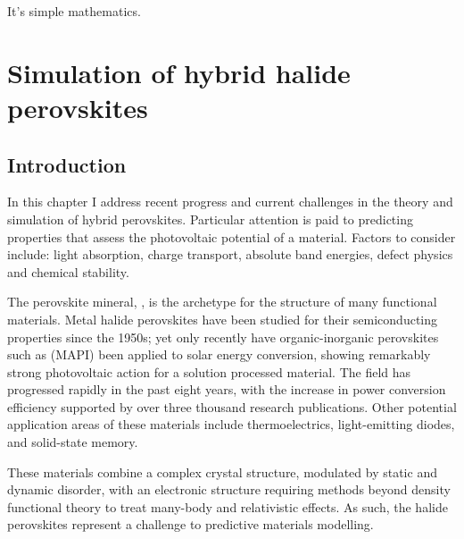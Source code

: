 \begin{savequote}[8cm]
It's simple mathematics.
\end{savequote}

\chapter{\label{ch:2-litreview}Simulation of hybrid halide perovskites}

\section{Introduction}

In this chapter I address recent progress and current challenges in the theory and simulation of hybrid perovskites. 
Particular attention is paid to predicting properties that assess the photovoltaic potential of a material. 
Factors to consider include: light absorption, charge transport, absolute band energies, defect physics and chemical stability. 

The perovskite mineral, , is the archetype for the structure of many functional materials.\autocite{Schaak2002}
Metal halide perovskites have been studied for their semiconducting properties since the 1950s\autocite{Moller1958}; 
yet only recently have organic-inorganic perovskites such as  (MAPI) been applied to solar energy conversion, showing remarkably strong photovoltaic action for a solution processed material.\autocite{Kojima2009}
The field has progressed rapidly in the past eight years, with the increase in power conversion efficiency supported by over three thousand research publications.\autocite{Stranks2015b,Saparov2016b,Park2016,Walsh2016,Wallace2017}
Other potential application areas of these materials include 
thermoelectrics,\autocite{He2014,Mettan2015}
light-emitting diodes,\autocite{Protesescu2015,Stranks2015b}
and
solid-state memory.\autocite{Yoo2015a,Liu2017}

These materials combine a complex crystal structure, modulated by static and dynamic disorder, with an electronic structure requiring methods beyond density functional theory to treat many-body and relativistic effects. 
As such, the halide perovskites represent a challenge to predictive materials modelling. 

